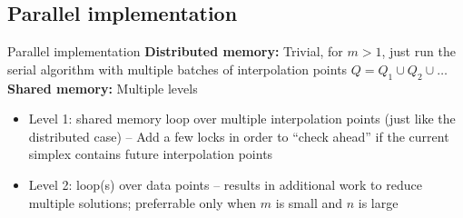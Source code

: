 \documentclass[xcolor=dvipsnames]{beamer}
\begin{document}
\subsection{Parallel implementation}
\begin{frame}{Parallel implementation}
\textbf{Distributed memory:} Trivial, for $m > 1$, just run
the serial algorithm with multiple batches of interpolation points
$Q = Q_1 \cup Q_2 \cup \ldots$\\
\medskip
{\bf Shared memory:} Multiple levels
\begin{itemize}
\item Level 1: shared memory loop over multiple interpolation points (just
like the distributed case)
-- Add a few locks in order to ``check ahead'' if the current simplex
contains future interpolation points
\item Level 2: loop(s) over data points -- results in additional work to
reduce multiple solutions; preferrable only when $m$ is small and $n$ is large
\end{itemize}
\end{frame}
\end{document}
